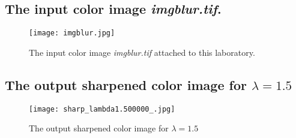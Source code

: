\documentclass{article}
\begin{document}
\subsection{The input color image \textit{imgblur.tif}.}
\begin{figure}[h]
    \centering
    \texttt{[image: imgblur.jpg]}
    \caption{The input color image \textit{imgblur.tif} attached to this laboratory.}
    \label{fig:7}
\end{figure}

\newpage
\subsection{The output sharpened color image for $\lambda = 1.5$}
\begin{figure}[h]
    \centering
    \texttt{[image: sharp\_lambda1.500000\_.jpg]}
    \caption{The output sharpened color image for $\lambda = 1.5$}
    \label{fig:8}
\end{figure}

\newpage
\end{document}
